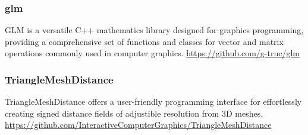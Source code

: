 \documentclass[intern]{cgMA}
\begin{document}
    \subsubsection*{glm}
    GLM is a versatile C++ mathematics library designed for graphics programming, providing a comprehensive set of functions and classes for vector and matrix operations commonly used in computer graphics. \url{https://github.com/g-truc/glm}

    \subsubsection*{TriangleMeshDistance}
    TriangleMeshDistance offers a user-friendly programming interface for effortlessly creating signed distance fields of adjustible resolution from 3D meshes. \url{https://github.com/InteractiveComputerGraphics/TriangleMeshDistance}

    \pagebreak
\end{document}
